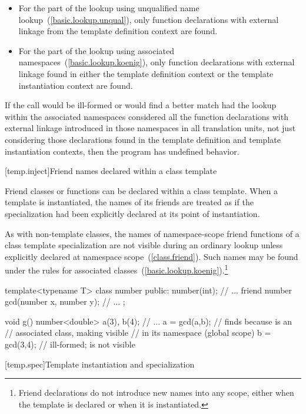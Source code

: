\begin{itemize}
\item
For the part of the lookup using unqualified name lookup~(\ref{basic.lookup.unqual}),
only function declarations with external linkage
from the template definition context are found.
\item
For the part of the lookup using associated namespaces~(\ref{basic.lookup.koenig}),
only function declarations with external linkage found in either the template
definition context or the template instantiation context are found.
\end{itemize}

If the call would be ill-formed or would find a better match had the lookup
within the associated namespaces considered all the function declarations with
external linkage introduced in those namespaces in all translation units,
not just considering those declarations found in the template definition and
template instantiation contexts, then the program has undefined behavior.

[temp.inject]{Friend names declared within a class template}

\pnum
Friend classes or functions can be declared within a class template.
When a template is instantiated, the names of its friends are treated
as if the specialization had been explicitly declared at its point of
instantiation.

\pnum
As with non-template classes, the names of namespace-scope friend
functions of a class template specialization are not visible during
an ordinary lookup unless explicitly declared at namespace scope~(\ref{class.friend}).
Such names may be found under the rules for associated
classes~(\ref{basic.lookup.koenig}).\footnote{Friend declarations do not
introduce new names into any scope, either
when the template is declared or when it is instantiated.}
\enterexample
\begin{codeblock}
template<typename T> class number {
public:
	number(int);
	// ...
	friend number gcd(number x, number y);
	// ...
};

void g()
{
	number<double> a(3), b(4);
	// ...
	a = gcd(a,b);		// finds  because  is an
				// associated class, making  visible
				// in its namespace (global scope)
	b = gcd(3,4);		// ill-formed;  is not visible
}
\end{codeblock}
\exitexampleb

[temp.spec]{Template instantiation and specialization}

